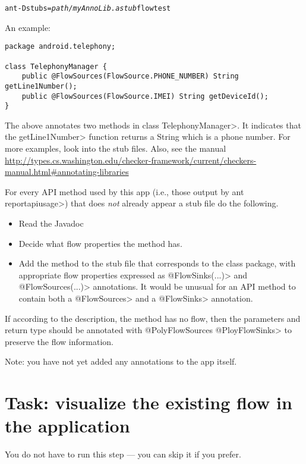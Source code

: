 \begin{alltt}
ant -Dstubs=\emph{path/myAnnoLib.astub} flowtest
\end{alltt}



An example:

\begin{Verbatim}
package android.telephony;

class TelephonyManager {
    public @FlowSources(FlowSource.PHONE_NUMBER) String getLine1Number();
    public @FlowSources(FlowSource.IMEI) String getDeviceId();
}
\end{Verbatim}

\noindent
The above annotates two methods in class \<TelephonyManager>.
It indicates that the \<getLine1Number> function returns a String which is a
phone number.  For more examples, look into the stub files. Also, see 
the manual \url{http://types.cs.washington.edu/checker-framework/current/checkers-manual.html#annotating-libraries}

For every API method used by this app (i.e., those output by \<ant
reportapiusage>) that does \emph{not} already appear a stub file do the following.
\begin{itemize}
\item
Read the Javadoc
\item
Decide what flow properties the method has.
\item
Add the method to the stub file that corresponds to the class package, with
appropriate flow properties expressed as \<@FlowSinks(...)> and
\<@FlowSources(...)> annotations.
It would be unusual for an API method to contain both a \<@FlowSources>
and a \<@FlowSinks> annotation.
\end{itemize}

If according to the description, the method has no flow, then the parameters and return type
 should be annotated with \<@PolyFlowSources @PloyFlowSinks>
  to preserve the flow information.


Note: you have not yet added any annotations to the app itself.


\section{Task: visualize the existing flow in the application}

You do not have to run this step --- you can skip it if you
prefer.

